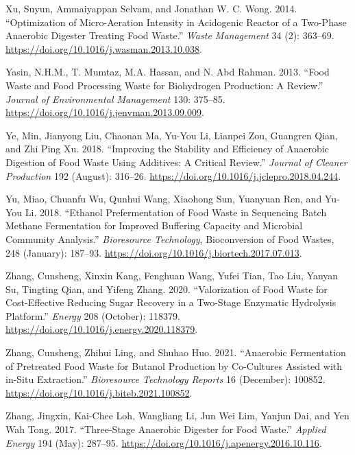 \documentclass[11pt]{report}
\begin{document}
\begin{hangparas}{1.5em}{1}
\hypertarget{citeproc_bib_item_83}{Xu, Suyun, Ammaiyappan Selvam, and Jonathan W. C. Wong. 2014. “Optimization of Micro-Aeration Intensity in Acidogenic Reactor of a Two-Phase Anaerobic Digester Treating Food Waste.” \textit{Waste Management} 34 (2): 363–69. \url{https://doi.org/10.1016/j.wasman.2013.10.038}.}

\hypertarget{citeproc_bib_item_84}{Yasin, N.H.M., T. Mumtaz, M.A. Hassan, and N. Abd Rahman. 2013. “Food Waste and Food Processing Waste for Biohydrogen Production: A Review.” \textit{Journal of Environmental Management} 130: 375–85. \url{https://doi.org/10.1016/j.jenvman.2013.09.009}.}

\hypertarget{citeproc_bib_item_85}{Ye, Min, Jianyong Liu, Chaonan Ma, Yu-You Li, Lianpei Zou, Guangren Qian, and Zhi Ping Xu. 2018. “Improving the Stability and Efficiency of Anaerobic Digestion of Food Waste Using Additives: A Critical Review.” \textit{Journal of Cleaner Production} 192 (August): 316–26. \url{https://doi.org/10.1016/j.jclepro.2018.04.244}.}

\hypertarget{citeproc_bib_item_86}{Yu, Miao, Chuanfu Wu, Qunhui Wang, Xiaohong Sun, Yuanyuan Ren, and Yu-You Li. 2018. “Ethanol Prefermentation of Food Waste in Sequencing Batch Methane Fermentation for Improved Buffering Capacity and Microbial Community Analysis.” \textit{Bioresource Technology}, Bioconversion of Food Wastes, 248 (January): 187–93. \url{https://doi.org/10.1016/j.biortech.2017.07.013}.}

\hypertarget{citeproc_bib_item_87}{Zhang, Cunsheng, Xinxin Kang, Fenghuan Wang, Yufei Tian, Tao Liu, Yanyan Su, Tingting Qian, and Yifeng Zhang. 2020. “Valorization of Food Waste for Cost-Effective Reducing Sugar Recovery in a Two-Stage Enzymatic Hydrolysis Platform.” \textit{Energy} 208 (October): 118379. \url{https://doi.org/10.1016/j.energy.2020.118379}.}

\hypertarget{citeproc_bib_item_88}{Zhang, Cunsheng, Zhihui Ling, and Shuhao Huo. 2021. “Anaerobic Fermentation of Pretreated Food Waste for Butanol Production by Co-Cultures Assisted with in-Situ Extraction.” \textit{Bioresource Technology Reports} 16 (December): 100852. \url{https://doi.org/10.1016/j.biteb.2021.100852}.}

\hypertarget{citeproc_bib_item_89}{Zhang, Jingxin, Kai-Chee Loh, Wangliang Li, Jun Wei Lim, Yanjun Dai, and Yen Wah Tong. 2017. “Three-Stage Anaerobic Digester for Food Waste.” \textit{Applied Energy} 194 (May): 287–95. \url{https://doi.org/10.1016/j.apenergy.2016.10.116}.}


\end{hangparas}
\end{document}
